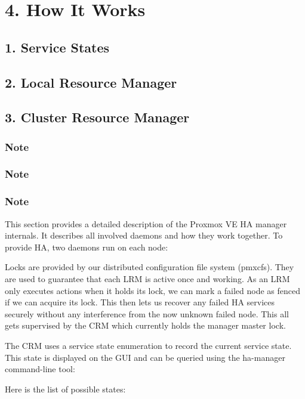 \section{4. How It Works}

\subsection{1. Service States}

\subsection{2. Local Resource Manager}

\subsection{3. Cluster Resource Manager}

\subsubsection{Note}

\subsubsection{Note}

\subsubsection{Note}

This section provides a detailed description of the Proxmox VE HA manager internals. It describes all involved daemons and how they work together. To provide HA, two daemons run on each node:

Locks are provided by our distributed configuration file system (pmxcfs). They are used to guarantee that each LRM is active once and working. As an LRM only executes actions when it holds its lock, we can mark a failed node as fenced if we can acquire its lock. This then lets us recover any failed HA services securely without any interference from the now unknown failed node. This all gets supervised by the CRM which currently holds the manager master lock.

The CRM uses a service state enumeration to record the current service state. This state is displayed on the GUI and can be queried using the ha-manager command-line tool:

Here is the list of possible states:

